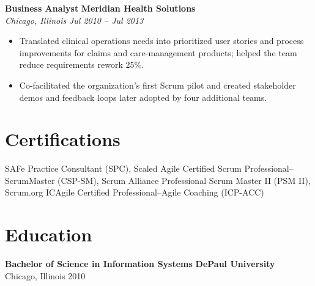 \documentclass[10pt,letterpaper]{article}
\newcommand{\role}[4]{%
  \textbf{#1} \hfill \textbf{#2}\\[-1pt]
  \textit{#3} \hfill \textit{#4}\vspace{1pt}
}
\begin{document}
\role{Business Analyst}{Meridian Health Solutions}{Chicago, Illinois}{Jul 2010 -- Jul 2013}
\begin{itemize}
  \item Translated clinical operations needs into prioritized user stories and process improvements for claims and care-management products; helped the team reduce requirements rework 25\%.
  \item Co-facilitated the organization's first Scrum pilot and created stakeholder demos and feedback loops later adopted by four additional teams.
\end{itemize}

\section*{Certifications}
SAFe Practice Consultant (SPC), Scaled Agile \textbar{} Certified Scrum Professional--ScrumMaster (CSP-SM), Scrum Alliance \textbar{} Professional Scrum Master II (PSM II), Scrum.org \textbar{} ICAgile Certified Professional--Agile Coaching (ICP-ACC)

\section*{Education}
\textbf{Bachelor of Science in Information Systems} \hfill \textbf{DePaul University}\\[-1pt]
Chicago, Illinois \hfill 2010
\end{document}
